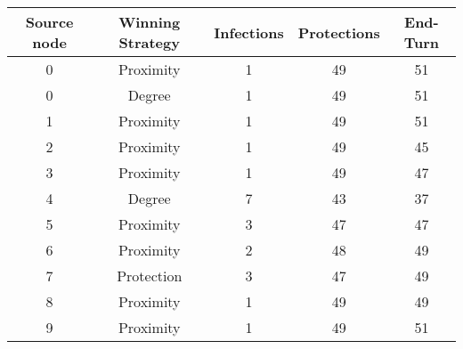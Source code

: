 \documentclass[results.tex]{subfiles}
\begin{document}
    \begin{center}
        \begin{tabular}{| c || c | c | c | c |}
            \hline
            {\bfseries Source node} & {\bfseries Winning Strategy} & {\bfseries Infections} & {\bfseries Protections}
            & {\bfseries End-Turn}
            \\  %
            \hline\hline
            0                       & Proximity                    & 1                      & 49                      & 51                   \\
            \hline
            0                       & Degree                       & 1                      & 49                      & 51                   \\
            \hline
            1                       & Proximity                    & 1                      & 49                      & 51                   \\
            \hline
            2                       & Proximity                    & 1                      & 49                      & 45                   \\
            \hline
            3                       & Proximity                    & 1                      & 49                      & 47                   \\
            \hline
            4                       & Degree                       & 7                      & 43                      & 37                   \\
            \hline
            5                       & Proximity                    & 3                      & 47                      & 47                   \\
            \hline
            6                       & Proximity                    & 2                      & 48                      & 49                   \\
            \hline
            7                       & Protection                   & 3                      & 47                      & 49                   \\
            \hline
            8                       & Proximity                    & 1                      & 49                      & 49                   \\
            \hline
            9                       & Proximity                    & 1                      & 49                      & 51                   \\

\end{tabular}
\end{center}
\end{document}
